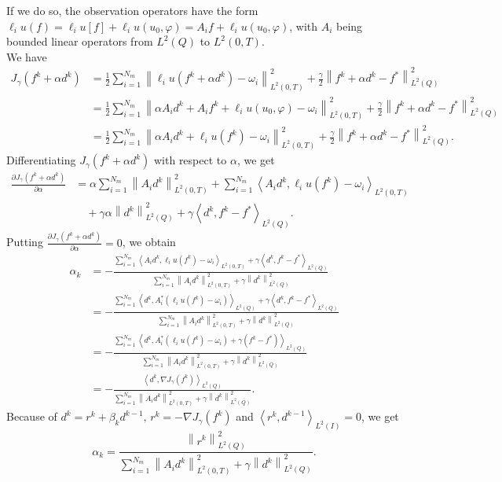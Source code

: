 \documentclass[]{article}
\begin{document}
\noindent If we do so, the observation operators have the form $\ell_i u(f)=\ell_i u[f]+\ell_i u(u_0, \varphi)=A_if+\ell_i u(u_0, \varphi)$, with $A_i$ being bounded linear operators from $L^2(Q)$ to $L^2(0, T)$.\\
We have
\begin{align*}
	J_{\gamma}(f^k+\alpha d^k)&=\frac{1}{2}\sum_{i=1}^{N_m}\left\|\ell_i u(f^k+\alpha d^k)-\omega_i\right\|_{L^2(0, T)}^2+\frac{\gamma}{2}\left\|f^k+\alpha d^k-f^*\right\|_{L^2(Q)}^2\\[0.2cm]
	&=\frac{1}{2}\sum_{i=1}^{N_m}\left\|\alpha A_id^k+A_if^k+\ell_i u(u_0, \varphi)-\omega_i\right\|_{L^2(0, T)}^2+\frac{\gamma}{2}\left\|f^k+\alpha d^k-f^*\right\|_{L^2(Q)}^2\\[0.2cm]
	&=\frac{1}{2}\sum_{i=1}^{N_m}\left\|\alpha A_id^k+\ell_i u(f^k)-\omega_i\right\|_{L^2(0, T)}^2+\frac{\gamma}{2}\left\|f^k+\alpha d^k-f^*\right\|_{L^2(Q)}^2.
\end{align*}
Differentiating $J_\gamma(f^k+\alpha d^k)$ with respect to $\alpha$, we get
\begin{align*}
	\frac{\partial J_\gamma(f^k+\alpha d^k)}{\partial \alpha} &= \alpha\sum_{i=1}^{N_m}\left\|A_id^k \right\|_{L^2(0, T)}^2+\sum_{i=1}^{N_m}\left\langle A_id^k,\ell_i u(f^k)-\omega_i\right\rangle_{L^2(0, T)}\\[0.2cm]
	&\quad+\gamma\alpha\left\| d^k\right\|_{L^2(Q)}^2+\gamma\left\langle d^k, f^k-f^*\right\rangle_{L^2(Q)}.
\end{align*}
Putting $\frac{\partial J_\gamma(f^k+\alpha d^k)}{\partial \alpha}=0$, we obtain
\begin{align*}
	\alpha_k&=-\frac{\displaystyle\sum_{i=1}^{N_m}\left\langle A_id^k, \ell_i u(f^k)-\omega_i\right\rangle_{L^2(0, T)}+\gamma\left\langle d^k, f^k-f^*\right\rangle_{L^2(Q)}}{\displaystyle\sum_{i=1}^{N_m}\left\|A_id^k\right\|^2_{L^2(0, T)}+\gamma\left\|d^k\right\|^2_{L^2(Q)}}\\[0.2cm]
	&=-\frac{\displaystyle\sum_{i=1}^{N_m}\left\langle d^k, A_i^*\left(\ell_i u(f^k)-\omega_i\right)\right\rangle_{L^2(Q)}+\gamma\left\langle d^k, f^k-f^*\right\rangle_{L^2(Q)}}{\displaystyle\sum_{i=1}^{N_m}\left\|A_id^k\right\|^2_{L^2(0, T)}+\gamma\left\|d^k\right\|^2_{L^2(Q)}}\\[0.2cm]
	&=-\frac{\displaystyle\sum_{i=1}^{N_m}\left\langle d^k, A_i^*\left(\ell_i u(f^k)-\omega_i\right)+\gamma(f^k-f^*)\right\rangle_{L^2(Q)}}{\displaystyle\sum_{i=1}^{N_m}\left\|A_id^k\right\|^2_{L^2(0, T)}+\gamma\left\|d^k\right\|^2_{L^2(Q)}}\\[0.2cm]
	&=-\frac{\left\langle d^k,\nabla J_\gamma(f^k)\right\rangle_{L^2(Q)}}{\displaystyle\sum_{i=1}^{N_m}\left\|A_id^k\right\|^2_{L^2(0, T)}+\gamma\left\|d^k\right\|^2_{L^2(Q)}}.
\end{align*}
Because of $d^k=r^k+\beta_kd^{k-1},\, r^k=-\nabla J_\gamma (f^k)$ and $\left\langle r^k,d^{k-1}\right\rangle_{L^2(I)}=0$, we get 
$$\alpha_k=\frac{\left\|r^k\right\|^2_{L^2(Q)}}{\displaystyle\sum_{i=1}^{N_m}\left\|A_id^k\right\|^2_{L^2(0, T)}+\gamma\left\|d^k\right\|^2_{L^2(Q)}}.$$
\end{document}
